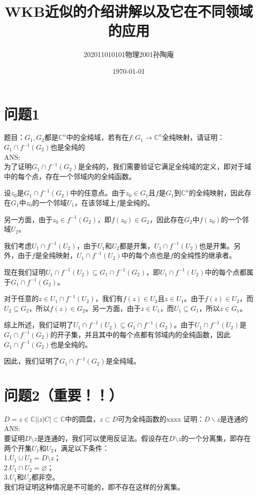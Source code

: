 \documentclass[12pt, a4paper, oneside]{article}
\title{WKB近似的介绍讲解以及它在不同领域的应用}
\date{\today}
\author{202011010101物理2001孙陶庵}
\begin{document}
\begin{spacing}{2.0}
\tableofcontents
\maketitle

\section{问题1}
题目：$G_1, G_2$都是$\mathbb{C}^n $中的全纯域，若有在$f: G_1 \to \mathbb{C} ^n$全纯映射，请证明：\\
$G_1\cap f^{-1}(G_2)$也是全纯的\\
ANS:
\\为了证明$G_1\cap f^{-1}(G_2)$是全纯的，我们需要验证它满足全纯域的定义，即对于域中的每个点，存在一个邻域内的全纯函数。

设$z_0$是$G_1\cap f^{-1}(G_2)$中的任意点。由于$z_0\in G_1$且$f$是$G_1$到$\mathbb{C}^n$的全纯映射，因此存在$G_1$中$z_0$的一个邻域$U_1$，在该邻域上$f$是全纯的。

另一方面，由于$z_0\in f^{-1}(G_2)$，即$f(z_0)\in G_2$，因此存在$G_2$中$f(z_0)$的一个邻域$U_2$。

我们考虑$U_1\cap f^{-1}(U_2)$，由于$U_1$和$U_2$都是开集，$U_1\cap f^{-1}(U_2)$也是开集。另外，由于$f$是全纯映射，$U_1\cap f^{-1}(U_2)$中的每个点也是$f$的全纯性的继承者。

现在我们证明$U_1\cap f^{-1}(U_2)\subseteq G_1\cap f^{-1}(G_2)$，即$U_1\cap f^{-1}(U_2)$中的每个点都属于$G_1\cap f^{-1}(G_2)$。

对于任意的$z\in U_1\cap f^{-1}(U_2)$，我们有$f(z)\in U_2$且$z\in U_1$。由于$f(z)\in U_2$，而$U_2\subseteq G_2$，所以$f(z)\in G_2$。另一方面，由于$z\in U_1$，而$U_1\subseteq G_1$，所以$z\in G_1$。

综上所述，我们证明了$U_1\cap f^{-1}(U_2)\subseteq G_1\cap f^{-1}(G_2)$。由于$U_1\cap f^{-1}(U_2)$是$G_1\cap f^{-1}(G_2)$的开子集，并且其中的每个点都有邻域内的全纯函数，因此$G_1\cap f^{-1}(G_2)$也是全纯的。

因此，我们证明了$G_1\cap f^{-1}(G_2)$是全纯域。


\section{问题2（重要！！）}

$D = {z\in \mathbb{C} ||z|C|}\subset \mathbb{C} $中的圆盘，$z\subset D$可为全纯函数的xxxx
证明：$D\backslash z$是连通的
\\
ANS:\\
要证明$D\setminus z$是连通的，我们可以使用反证法。假设存在$D\setminus z$的一个分离集，即存在两个开集$U_1$和$U_2$，满足以下条件：
\\
1.$U_1 \cup U_2 = D\setminus z$；\\
2.$U_1 \cap U_2 = \varnothing$；\\
3.$U_1$和$U_2$都非空。\\
我们将证明这种情况是不可能的，即不存在这样的分离集。


\end{spacing}
\end{document}
